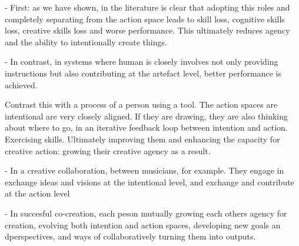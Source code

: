 - First: as we have shown, in the literature is clear that adopting this roles and completely separating from the action space leads to skill loss, cognitive skills loss, creative skills loss and worse performance. This ultimately reduces agency and the ability to intentionally create things.

- In contrast, in systems where human is closely involves not only providing instructions but also contributing at the artefact level, better performance is achieved. 

Contrast this with a process of a person using a tool. The action spaces are intentional are very closely aligned. If they are drawing, they are also thinking about where to go, in an iterative feedback loop between intention and action. Exercising skills. Ultimately improving them and enhancing the capacity for creative action: growing their creative agency as a result. 



- In a creative collaboration, between musicians, for example. They engage in exchange ideas and visions at the intentional level, and exchange and contribute at the action level \cite{Bown2020-zn}

- In succesful co-creation, each peson mutually growing each others agency for creation, evolving both intention and action spaces, developing new goals an dperspectives, and ways of collaboratively turning them into outputs.